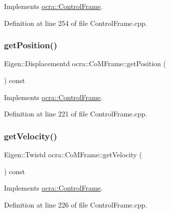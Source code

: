 Implements \hyperlink{classocra_1_1ControlFrame_ab8a1e5e3d96d7524112b4c88bf0bc5ee}{ocra\+::\+Control\+Frame}.



Definition at line 254 of file Control\+Frame.\+cpp.

\hypertarget{classocra_1_1CoMFrame_a809c05664b2e2abb489e930e27fbe2d4}{}\label{classocra_1_1CoMFrame_a809c05664b2e2abb489e930e27fbe2d4} 
\subsubsection{\texorpdfstring{get\+Position()}{getPosition()}}
{\footnotesize\ttfamily Eigen\+::\+Displacementd ocra\+::\+Co\+M\+Frame\+::get\+Position (\begin{DoxyParamCaption}{ }\end{DoxyParamCaption}) const\hspace{0.3cm}{\ttfamily [virtual]}}



Implements \hyperlink{classocra_1_1ControlFrame_aaadbbfbcdd5b8e197a0f181ffb2fdcbe}{ocra\+::\+Control\+Frame}.



Definition at line 221 of file Control\+Frame.\+cpp.

\hypertarget{classocra_1_1CoMFrame_a02be3e73c64903d67b1e7ada25c468c5}{}\label{classocra_1_1CoMFrame_a02be3e73c64903d67b1e7ada25c468c5} 
\subsubsection{\texorpdfstring{get\+Velocity()}{getVelocity()}}
{\footnotesize\ttfamily Eigen\+::\+Twistd ocra\+::\+Co\+M\+Frame\+::get\+Velocity (\begin{DoxyParamCaption}{ }\end{DoxyParamCaption}) const\hspace{0.3cm}{\ttfamily [virtual]}}



Implements \hyperlink{classocra_1_1ControlFrame_a398df839f75886867c86a8e70ac9bf24}{ocra\+::\+Control\+Frame}.



Definition at line 226 of file Control\+Frame.\+cpp.

